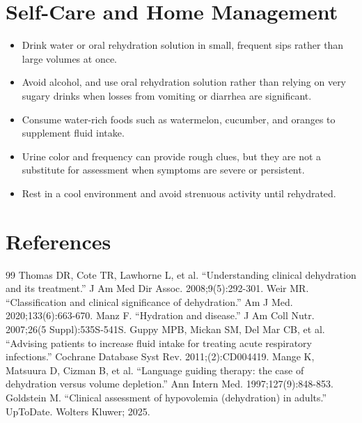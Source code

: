 \section*{Self-Care and Home Management}
\begin{itemize}
  \item Drink water or oral rehydration solution in small, frequent sips rather than large volumes at once.
  \item Avoid alcohol, and use oral rehydration solution rather than relying on very sugary drinks when losses from vomiting or diarrhea are significant.
  \item Consume water-rich foods such as watermelon, cucumber, and oranges to supplement fluid intake.
  \item Urine color and frequency can provide rough clues, but they are not a substitute for assessment when symptoms are severe or persistent.
  \item Rest in a cool environment and avoid strenuous activity until rehydrated.
\end{itemize}

\section*{References}
\begin{thebibliography}{99}
 Thomas DR, Cote TR, Lawhorne L, et al. ``Understanding clinical dehydration and its treatment.'' J Am Med Dir Assoc. 2008;9(5):292-301.
 Weir MR. ``Classification and clinical significance of dehydration.'' Am J Med. 2020;133(6):663-670.
 Manz F. ``Hydration and disease.'' J Am Coll Nutr. 2007;26(5 Suppl):535S-541S.
 Guppy MPB, Mickan SM, Del Mar CB, et al. ``Advising patients to increase fluid intake for treating acute respiratory infections.'' Cochrane Database Syst Rev. 2011;(2):CD004419.
 Mange K, Matsuura D, Cizman B, et al. ``Language guiding therapy: the case of dehydration versus volume depletion.'' Ann Intern Med. 1997;127(9):848-853.
 Goldstein M. ``Clinical assessment of hypovolemia (dehydration) in adults.'' UpToDate. Wolters Kluwer; 2025.
\end{thebibliography}
